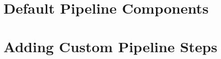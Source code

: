 \documentclass{article}\usepackage[]{graphicx}\usepackage[]{color}
\begin{document}
\section{Default Pipeline Components} \label{default-pipeline} %

\clearpage

% 

% 


% 
\section[Custom Pipeline Steps]{Adding Custom Pipeline Steps}\label{custom-pipeline-steps}%

\end{document}
